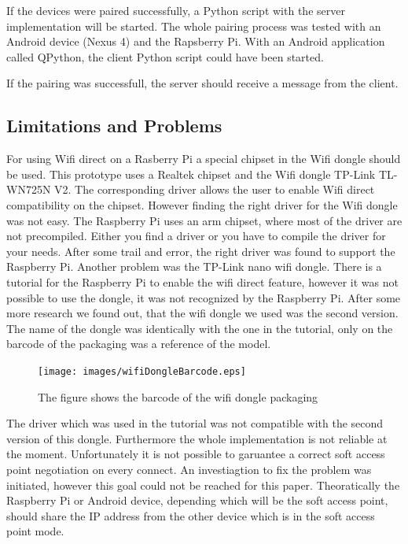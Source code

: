 \noindent If the devices were paired successfully, a Python script with the server implementation will be started.
The whole pairing process was tested with an Android device (Nexus 4) and the Rapsberry Pi. With an Android application called QPython, the client Python script could have been started.

If the pairing was successfull, the server should receive a message from the client.

\subsection*{Limitations and Problems}
\label{subsec:RaspberryLimitationsProblems}
For using Wifi direct on a Rasberry Pi a special chipset in the Wifi dongle should be used. This prototype uses a Realtek chipset and the Wifi dongle TP-Link TL-WN725N V2. The corresponding driver allows the user to enable Wifi direct compatibility on the chipset. However finding the right driver for the Wifi dongle was not easy. The Raspberry Pi uses an arm chipset, where most of the driver are not precompiled. Either you find a driver or you have to compile the driver for your needs. After some trail and error, the right driver was found to support the Raspberry Pi. Another problem was the TP-Link nano wifi dongle. There is  a tutorial for the Raspberry Pi to enable the wifi direct feature, however it was not possible to use the dongle, it was not recognized by the Raspberry Pi. After some more research we found out, that the wifi dongle we used was the second version. The name of the dongle was identically with the one in the tutorial, only on the barcode of the packaging was a reference of the model.

\begin{figure}[!hb]
	\centering
  \texttt{[image: images/wifiDongleBarcode.eps]}
	\caption{The figure shows the barcode of the wifi dongle packaging}
	\label{fig1}
\end{figure}

\noindent The driver which was used in the tutorial was not compatible with the second version of this dongle. Furthermore the whole implementation is not reliable at the moment. Unfortunately it is not possible to garuantee a correct soft access point negotiation on every connect. An investiagtion to fix the problem was initiated, however this goal could not be reached for this paper. Theoratically the Raspberry Pi or Android device, depending which will be the soft access point, should share the IP address from the other device which is in the soft access point mode.


